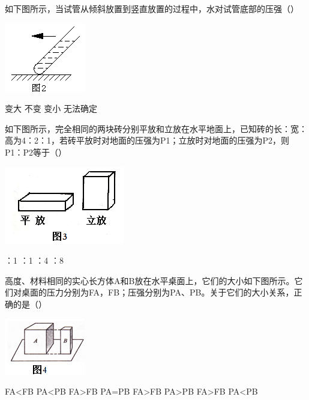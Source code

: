 \documentclass[12pt]{exam}%
\begin{document}
\begin{Aquestions}
\begin{questions}
\question
如下图所示，当试管从倾斜放置到竖直放置的过程中，水对试管底部的压强（\answerline*[A]）
\begin{multicols}{2}
\includegraphics[scale=1]{figures/图片+2.png} 
\columnbreak
\begin{choices}
\choice 变大
\choice 不变
\choice 变小
\choice 无法确定
\end{choices}
\end{multicols}


\question
如下图所示，完全相同的两块砖分别平放和立放在水平地面上，已知砖的长：宽：高为4：2：1，若砖平放时对地面的压强为P1；立放时对地面的压强为P2，则P1：P2等于（\answerline*[C]）
\begin{multicols}{2}
\includegraphics[scale=1]{figures/图片+3.png} 
\columnbreak
\begin{choices}
：1
：1
：4
：8
\end{choices}
\end{multicols}


\question
高度、材料相同的实心长方体A和B放在水平桌面上，它们的大小如下图所示。它们对桌面的压力分别为FA，FB；压强分别为PA、PB。关于它们的大小关系，正确的是（\answerline*[B]）
\begin{multicols}{2}
\includegraphics[scale=1]{figures/图片+4.png} 
\columnbreak
\begin{choices}
\choice FA<FB   PA<PB
\choice FA>FB   PA=PB
\choice FA>FB   PA>PB
\choice FA>FB    PA<PB
\end{choices}
\end{multicols}



\end{questions}
\end{Aquestions}
\end{document}
